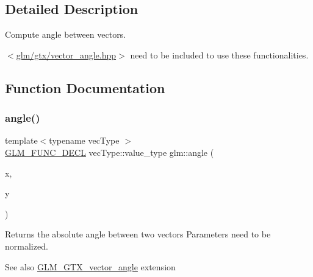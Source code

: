 \subsection{Detailed Description}
Compute angle between vectors. 

$<$\hyperlink{vector__angle_8hpp}{glm/gtx/vector\+\_\+angle.\+hpp}$>$ need to be included to use these functionalities. 

\subsection{Function Documentation}
\mbox{\label{group__gtx__vector__angle_gab8691008a2536b681b711211816c14f7}} 
\subsubsection{\texorpdfstring{angle()}{angle()}}
{\footnotesize\ttfamily template$<$typename vec\+Type $>$ \\
\hyperlink{setup_8hpp_ab2d052de21a70539923e9bcbf6e83a51}{G\+L\+M\+\_\+\+F\+U\+N\+C\+\_\+\+D\+E\+CL} vec\+Type\+::value\+\_\+type glm\+::angle (\begin{DoxyParamCaption}\item[{vec\+Type const \&}]{x,  }\item[{vec\+Type const \&}]{y }\end{DoxyParamCaption})}

Returns the absolute angle between two vectors Parameters need to be normalized. \begin{DoxySeeAlso}{See also}
\hyperlink{group__gtx__vector__angle}{G\+L\+M\+\_\+\+G\+T\+X\+\_\+vector\+\_\+angle} extension 
\end{DoxySeeAlso}
\mbox{\label{group__gtx__vector__angle_ga6f9cbae1b02b49ad92a1d0070649f038}} 
